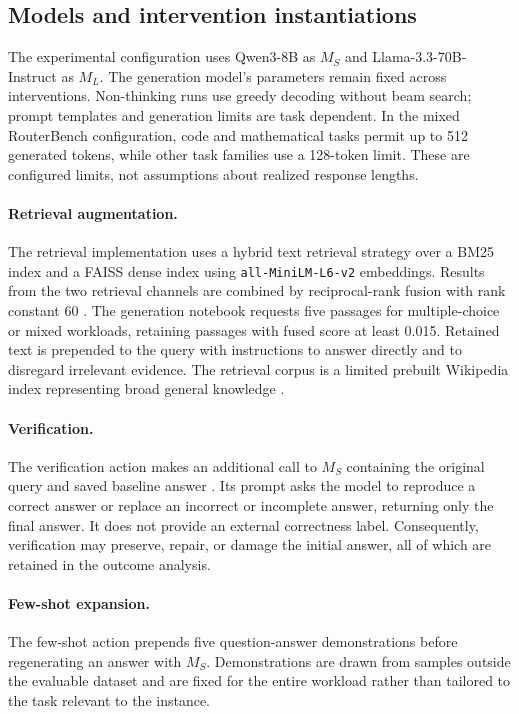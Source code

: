 \documentclass[sigconf]{acmart}
\begin{document}
\subsection{Models and intervention instantiations}

The experimental configuration uses Qwen3-8B as $M_S$ and Llama-3.3-70B-Instruct as $M_L$. The generation model's parameters remain fixed across interventions. Non-thinking runs use greedy decoding without beam search; prompt templates and generation limits are task dependent. In the mixed RouterBench configuration, code and mathematical tasks permit up to 512 generated tokens, while other task families use a 128-token limit. These are configured limits, not assumptions about realized response lengths.


\paragraph{Retrieval augmentation.}
The retrieval implementation uses a hybrid text retrieval strategy over a BM25 index and a FAISS dense index using \texttt{all-MiniLM-L6-v2} embeddings. Results from the two retrieval channels are combined by reciprocal-rank fusion with rank constant 60 \cite{todo}. The generation notebook requests five passages for multiple-choice or mixed workloads, retaining passages with fused score at least 0.015. Retained text is prepended to the query with instructions to answer directly and to disregard irrelevant evidence. The retrieval corpus is a limited prebuilt Wikipedia index representing broad general knowledge \cite{todo}.

\paragraph{Verification.}
The verification action makes an additional call to $M_S$ containing the original query and saved baseline answer \cite{selfverify}. Its prompt asks the model to reproduce a correct answer or replace an incorrect or incomplete answer, returning only the final answer. It does not provide an external correctness label. Consequently, verification may preserve, repair, or damage the initial answer, all of which are retained in the outcome analysis.

\paragraph{Few-shot expansion.}
The few-shot action prepends five question-answer demonstrations before regenerating an answer with $M_S$. Demonstrations are drawn from samples outside the evaluable dataset and are fixed for the entire workload rather than tailored to the task relevant to the instance.
\end{document}
